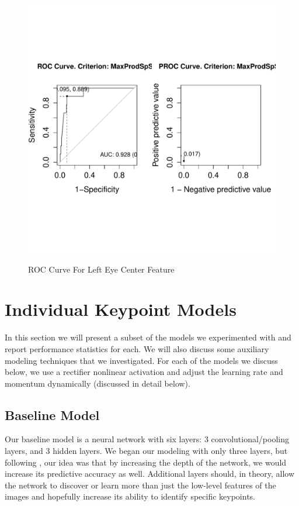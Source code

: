 \documentclass[journal]{IEEEtran}
\begin{document}
\begin{figure}[!htb]
  \centering
  \caption{ROC Curve For Left Eye Center Feature}
  \includegraphics[scale=.49]{roc_left_eye_center.pdf}
  \label{fig:roc_left_eye_center}
\end{figure}




\section{Individual Keypoint Models}\label{neural}

In this section we will present a subset of the models we experimented with and report performance statistics for each. We will also discuss some auxiliary modeling techniques that we investigated. For each of the models we discuss below, we use a rectifier nonlinear activation and adjust the learning rate and momentum dynamically (discussed in detail below). 

\subsection{Baseline Model}

Our baseline model is a neural network with six layers: 3 convolutional/pooling layers, and 3 hidden layers. We began our modeling with only three layers, but following \cite{benlecun2007}, our idea was that by increasing the depth of the network, we would increase its predictive accuracy as well. Additional layers should, in theory, allow the network to discover or learn more than just the low-level features of the images and hopefully increase its ability to identify specific keypoints.
\end{document}
